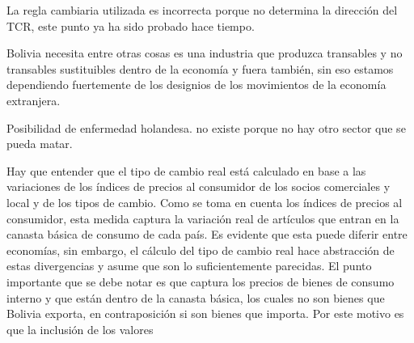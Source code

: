 \documentclass[12pt,letterpaper]{article}
\begin{document}
La regla cambiaria utilizada es incorrecta porque no determina la dirección del TCR, este punto ya ha sido probado hace tiempo.


Bolivia necesita entre otras cosas es una industria que produzca transables y no transables sustituibles dentro de la economía y fuera también, sin eso estamos dependiendo fuertemente de los designios de los movimientos de la economía extranjera.

Posibilidad de enfermedad holandesa. no existe porque no hay otro sector que se pueda matar.


Hay que entender que el tipo de cambio real está calculado en base a las variaciones de los índices de precios al consumidor de los socios comerciales y local y de los tipos de cambio. Como se toma en cuenta los índices de precios al consumidor, esta medida captura la variación real de artículos que entran en la canasta básica de consumo de cada país. Es evidente que esta puede diferir entre economías, sin embargo, el cálculo del tipo de cambio real hace abstracción de estas divergencias y asume que son lo suficientemente parecidas. El punto importante que se debe notar es que captura los precios de bienes de consumo interno y que están dentro de la canasta básica, los cuales no son bienes que Bolivia exporta, en contraposición si son bienes que importa. Por este motivo es que la inclusión de los valores 




\end{document}
